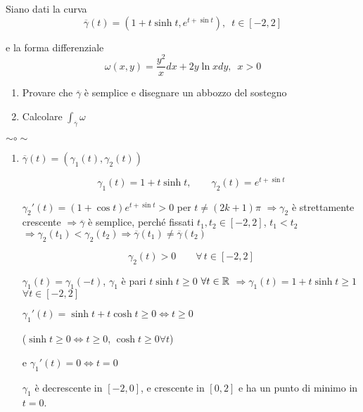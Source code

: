 \begin{exbar}
\begin{example}
	Siano dati la curva 
	\begin{equation*}
		\overline{\gamma}(t)=(1+t \sinh t, e^{t+\sin t}), \,\,\, t \in [-2,2]
	\end{equation*}
	
	e la forma differenziale
	\begin{equation*}
		\omega(x,y)=\frac{y^2}{x} dx+2y \ln x dy,\,\,\, x >0
	\end{equation*}
	
	\begin{enumerate}
		\item Provare che $\overline{\gamma}$ è semplice e disegnare un abbozzo del sostegno
		\item Calcolare $\int_{\overline{\gamma}}\omega$
	\end{enumerate}
	
	{\centering $\sim \circ \sim$ \par}
	
	\begin{enumerate}
		\item $\overline{\gamma}(t)=(\gamma_1(t),\gamma_2(t))$
		
		$$\gamma_1(t)=1+t \sinh t, \qquad \gamma_2 (t)=e^{t+\sin t}$$
		
		$\gamma_2' (t)=(1+\cos t) e^{t+\sin t} >0$ per $ t \neq (2k+1)\pi$ $\Rightarrow \gamma_2$ è strettamente crescente $\Rightarrow \overline{\gamma}$ è semplice, perché fissati $t_1, t_2 \in [-2,2]$, $t_1< t_2$ $\Rightarrow \gamma_2(t_1)< \gamma_2(t_2)\Rightarrow \overline{\gamma}(t_1)\neq \overline{\gamma}(t_2)$
		
		$$\gamma_2 (t)>0 \qquad \forall \, t \in [-2,2]$$
		
		$\gamma_1 (t)= \gamma_1(-t)$, $\gamma_1$ è pari $t\sinh t \geq 0$ $\forall t \in \mathbb{R}$	$\Rightarrow \gamma_1(t)= 1+t \sinh t \geq 1$ $\forall t \in [-2,2]$
		
		{\centering
			$\gamma_1' (t)=\sinh t + t \cosh t \geq 0 \iff t \geq 0$
		
			{\color{blue}
				($\sinh t \geq 0 \Leftrightarrow t \geq 0$, $\cosh t \geq 0 \forall t$)}
			
			e $\gamma_1' (t)=0 \Leftrightarrow t=0$
		\par} 
		
		$\gamma_1$ è decrescente in $[-2,0]$, e crescente in $[0,2]$ e ha un punto di minimo in $t=0$.
		
		

\end{enumerate}
\end{example}
\end{exbar}
